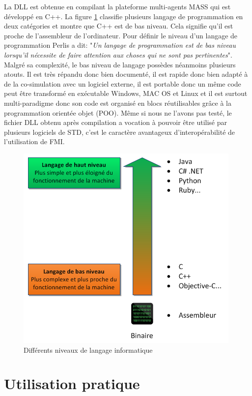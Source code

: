 La DLL est obtenue en compilant la plateforme multi-agents MASS qui est développé en C++. La figure \ref{fig:CPP} classifie plusieurs langage de programmation en deux catégories et montre que C++ est de bas niveau. Cela signifie qu'il est proche de l'assembleur de l'ordinateur. Pour définir le niveau d'un langage de programmation Perlis \cite{Perlis-82} a dit: "\textit{Un langage de programmation est de bas niveau lorsqu'il nécessite de faire attention aux choses qui ne sont pas pertinentes}". Malgré sa complexité, le bas niveau de langage possèdes néanmoins plusieurs atouts. Il est très répandu donc bien documenté, il est rapide donc bien adapté à de la co-simulation avec un logiciel externe, il est portable donc un même code peut être transformé en exécutable Windows, MAC OS et Linux et il est surtout multi-paradigme donc son code est organisé en blocs réutilisables grâce à la programmation orientée objet (POO). Même si nous ne l'avons pas testé, le fichier DLL obtenu après compilation a vocation à pouvoir être utilisé par plusieurs logiciels de STD, c'est le caractère avantageux d'interopérabilité de l'utilisation de FMI.

\begin{figure}
\centering
\includegraphics[scale=0.9]{Images/CPP}
\caption{Différents niveaux de langage informatique}
\label{fig:CPP}
\end{figure}

\section{Utilisation pratique}

